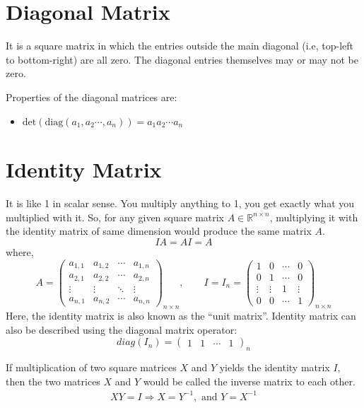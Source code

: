 \documentclass[conference,final,11pt,technote,onecolumn]{IEEEtran}\usepackage[]{graphicx}\usepackage[]{color}
\begin{document}
	\section{Diagonal Matrix}
	\label{term:diagonal_matrix}
It is a square matrix in which the entries outside the main diagonal (i.e, top-left to bottom-right) are all zero. The diagonal entries themselves may or may not be zero.

Properties of the diagonal matrices are:
\begin{itemize}
\item $\text{det}(\text{diag}(a_1, a_2\cdots, a_n)) = a_1a_2\cdots a_n$
\end{itemize}
	
	\section{Identity Matrix}
	\label{term:identity_matrix}
It is like 1 in scalar sense. You multiply anything to 1, you get exactly what you multiplied with it. So, for any given square matrix $A\in\mathbb{R}^{n\times n}$, multiplying it with the identity matrix of same dimension would produce the same matrix $A$.
\begin{equation}
IA = AI = A
\end{equation}
where,
\[ 
A =
 \begin{pmatrix}
  a_{1,1} & a_{1,2} & \cdots & a_{1,n} \\
  a_{2,1} & a_{2,2} & \cdots & a_{2,n} \\
  \vdots  & \vdots  & \ddots & \vdots  \\
  a_{n,1} & a_{n,2} & \cdots & a_{n,n}
 \end{pmatrix}_{n\times n}, \qquad I = I_n = 
 \begin{pmatrix}
 	1 & 0 & \cdots & 0 \\
 	0 & 1 & \cdots & 0 \\
 	\vdots & \vdots & 1 & \vdots \\
 	0 & 0 & \cdots & 1
 \end{pmatrix}_{n\times n}
\]
Here, the identity matrix is also known as the ``unit matrix''\cite{akivis2012introduction}.
Identity matrix can also be described using the diagonal matrix operator:
\[
diag(I_n) = \begin{pmatrix}
			1 & 1 & \cdots & 1
			\end{pmatrix}_{n}
\]

If multiplication of two square matrices $X$ and $Y$ yields the identity matrix $I$, then the two matrices $X$ and $Y$ would be called the inverse matrix to each other.
\begin{eqnarray}
\nonumber X Y = I \Rightarrow X = Y^{-1}, \text{ and } Y = X^{-1}
\end{eqnarray}
\end{document}
